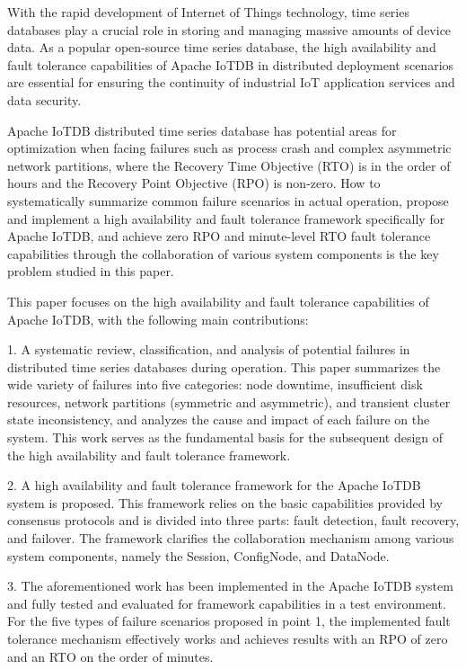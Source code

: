 \begin{abstract*}
  
  With the rapid development of Internet of Things technology, time series databases play a crucial role in storing and managing massive amounts of device data. As a popular open-source time series database, the high availability and fault tolerance capabilities of Apache IoTDB in distributed deployment scenarios are essential for ensuring the continuity of industrial IoT application services and data security.

  Apache IoTDB distributed time series database has potential areas for optimization when facing failures such as process crash and complex asymmetric network partitions, where the Recovery Time Objective (RTO) is in the order of hours and the Recovery Point Objective (RPO) is non-zero. How to systematically summarize common failure scenarios in actual operation, propose and implement a high availability and fault tolerance framework specifically for Apache IoTDB, and achieve zero RPO and minute-level RTO fault tolerance capabilities through the collaboration of various system components is the key problem studied in this paper.

  This paper focuses on the high availability and fault tolerance capabilities of Apache IoTDB, with the following main contributions:

  1. A systematic review, classification, and analysis of potential failures in distributed time series databases during operation. This paper summarizes the wide variety of failures into five categories: node downtime, insufficient disk resources, network partitions (symmetric and asymmetric), and transient cluster state inconsistency, and analyzes the cause and impact of each failure on the system. This work serves as the fundamental basis for the subsequent design of the high availability and fault tolerance framework.
  
  2. A high availability and fault tolerance framework for the Apache IoTDB system is proposed. This framework relies on the basic capabilities provided by consensus protocols and is divided into three parts: fault detection, fault recovery, and failover. The framework clarifies the collaboration mechanism among various system components, namely the Session, ConfigNode, and DataNode.
  
  3. The aforementioned work has been implemented in the Apache IoTDB system and fully tested and evaluated for framework capabilities in a test environment. For the five types of failure scenarios proposed in point 1, the implemented fault tolerance mechanism effectively works and achieves results with an RPO of zero and an RTO on the order of minutes.


\end{abstract*}
